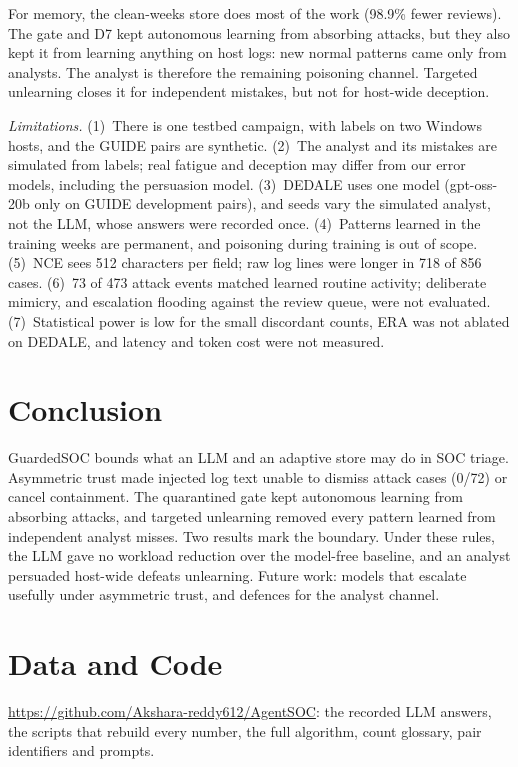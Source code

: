 \documentclass[conference]{IEEEtran}
\begin{document}
For memory, the clean-weeks store does most of the work (98.9\% fewer reviews). The gate and D7 kept autonomous
learning from absorbing attacks, but they also kept it from learning anything on host logs: new normal patterns
came only from analysts. The analyst is therefore the remaining poisoning channel. Targeted unlearning closes it for
independent mistakes, but not for host-wide deception.

\emph{Limitations.} (1)~There is one testbed campaign, with labels on two Windows hosts, and the GUIDE pairs are
synthetic. (2)~The analyst and its mistakes are simulated from labels; real fatigue and deception may differ from
our error models, including the persuasion model. (3)~DEDALE uses one model (gpt-oss-20b only on GUIDE development
pairs), and seeds vary the simulated analyst, not the LLM, whose answers were recorded once. (4)~Patterns learned
in the training weeks are permanent, and poisoning during training is out of scope. (5)~NCE sees 512 characters per
field; raw log lines were longer in 718 of 856 cases. (6)~73 of 473 attack events matched learned routine activity;
deliberate mimicry, and escalation flooding against the review queue, were not evaluated. (7)~Statistical power is
low for the small discordant counts, ERA was not ablated on DEDALE, and latency and token cost were not measured.

\section{Conclusion}

GuardedSOC bounds what an LLM and an adaptive store may do in SOC triage. Asymmetric trust made injected log text
unable to dismiss attack cases (0/72) or cancel containment. The quarantined gate kept autonomous learning from
absorbing attacks, and targeted unlearning removed every pattern learned from independent analyst misses. Two
results mark the boundary. Under these rules, the LLM gave no workload reduction over the model-free baseline, and
an analyst persuaded host-wide defeats unlearning. Future work: models that escalate usefully under asymmetric
trust, and defences for the analyst channel.

\section*{Data and Code}

\url{https://github.com/Akshara-reddy612/AgentSOC}: the recorded LLM answers, the scripts that rebuild every number,
the full algorithm, count glossary, pair identifiers and prompts.
\end{document}
